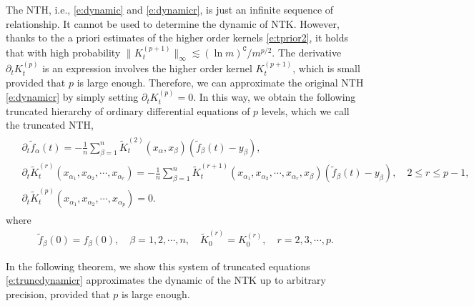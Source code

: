 \documentclass{article}
\numberwithin{equation}{section}
\newcommand{\fC}{{\mathtt C}}
\newcommand{\fK}{{\frak K}}
\newcommand{\al}{\alpha}
\renewcommand{\leq}{\leqslant}
\newcommand{\del}{\partial}
\newcommand{\1}{\mathds{1}}
\theoremstyle{plain} %
\begin{document}
The NTH, i.e., \eqref{e:dynamic} and \eqref{e:dynamicr}, is just an infinite sequence of relationship. It cannot be used to determine the dynamic of NTK. However, thanks to the a priori estimates of the higher order kernels \eqref{e:tprior2}, it holds that with high probability $\|K_t^{(p+1)}\|_\infty\lesssim (\ln m)^\fC/m^{p/2}$. The derivative $\del_t K_t^{(p)}$ is an expression involves the higher order kernel $K_t^{(p+1)}$, which is small provided that $p$ is large enough. Therefore, we can approximate the original NTH \eqref{e:dynamicr} by simply setting $\del_t K_t^{(p)}=0$. In this way, we obtain the following truncated hierarchy of ordinary differential equations of $p$ levels, which we call {the truncated NTH}, 
\begin{align}\begin{split}\label{e:truncdynamicr}
&\del_t\tilde f_\al(t)=-\frac{1}{n}  \sum_{\beta=1}^n \tilde K^{(2)}_t(x_\al, x_{\beta})(\tilde f_\beta(t)-y_\beta),\\
&\del_t\tilde K_t^{(r)}( x_{\al_1}, x_{\al_2}, \cdots, x_{\al_{r}})=-\frac{1}{n} \sum_{\beta=1}^n \tilde K_t^{(r+1)}(x_{\al_1}, x_{\al_2}, \cdots, x_{\al_r}, x_\beta)(\tilde f_\beta(t)-y_\beta), \quad 2\leq r\leq p-1,\\
&\del_t\tilde K_t^{(p)}(x_{\al_1}, x_{\al_2}, \cdots, x_{\al_{p}})=0.
\end{split}\end{align}
where 
\begin{align*}
\tilde f_\beta(0)= f_\beta(0), \quad \beta=1,2,\cdots, n, \quad \tilde K_0^{(r)}=K_0^{(r)},\quad r=2,3,\cdots, p.
\end{align*}

In the following theorem, we show this system of truncated equations \eqref{e:truncdynamicr} approximates the dynamic of the NTK up to arbitrary precision, provided that $p$ is large enough. 





\end{document}
